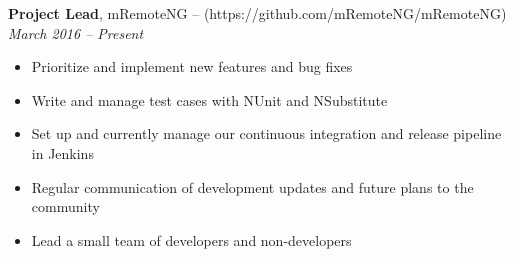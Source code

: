 {\bf Project Lead}, mRemoteNG -- (https://github.com/mRemoteNG/mRemoteNG)\\
{\it March 2016 – Present}
\begin{itemize}
	\item Prioritize and implement new features and bug fixes
	\item Write and manage test cases with NUnit and NSubstitute
	\item Set up and currently manage our continuous integration and release pipeline in Jenkins
	\item Regular communication of development updates and future plans to the community
	\item Lead a small team of developers and non-developers
\end{itemize}